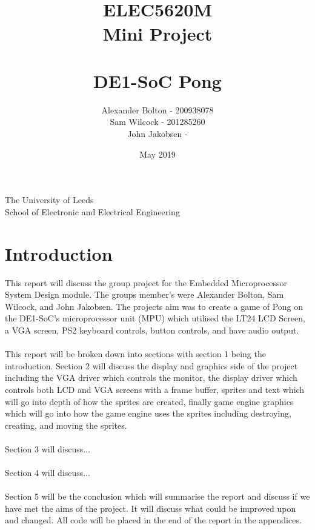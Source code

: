 \documentclass[a4paper,12pt]{article}
\begin{document}
\title{\\ \textbf{ELEC5620M \\ Mini Project \\ \- \\ DE1-SoC Pong }}
\author{Alexander Bolton - 200938078 \\ Sam Wilcock - 201285260\\ John Jakobsen - }
\date{May 2019}
\maketitle
\begin{center}

\end{center}
\vfill
\begin{center}
The University of Leeds \\  School of Electronic and Electrical Engineering
\end{center}
\newpage

\tableofcontents
\newpage 
\section{Introduction}
\begin{flushleft}
This report will discuss the group project for the Embedded Microprocessor System Design module. The groups member's were Alexander Bolton, Sam Wilcock, and John Jakobsen. The projects aim was to create a game of Pong on the DE1-SoC's microprocessor unit (MPU) which utilised the LT24 LCD Screen, a VGA screen, PS2 keyboard controls, button controls, and have audio output.
\\ \- \\
This report will be broken down into sections with section 1 being the introduction. Section 2 will discuss the display and graphics side of the project including the VGA driver which controls the monitor, the display driver which controls both LCD and VGA screens with a frame buffer, sprites and text which will go into depth of how the sprites are created, finally game engine graphics which will go into how the game engine uses the sprites including destroying, creating, and moving the sprites. 
\\ \- \\
Section 3 will discuss...
\\ \- \\
Section 4 will discuss...
\\ \- \\
Section 5 will be the conclusion which will summarise the report and discuss if we have met the aims of the project. It will discuss what could be improved upon and changed. All code will be placed in the end of the report in the appendices. 
\end{flushleft}
\newpage
\end{document}
